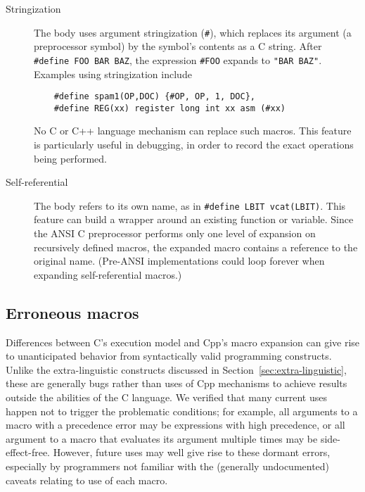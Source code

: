 \documentclass[10pt]{article}
\begin{document}
\begin{description}

\item[Stringization]
  The body uses argument stringization ({\tt \#}), which replaces its
  argument (a preprocessor symbol) by the symbol's contents as a C string.
  After {\tt \#define FOO BAR BAZ}, the expression {\tt \#FOO} expands to
  {\tt "BAR~BAZ"}.  Examples using stringization include
\begin{verbatim}
    #define spam1(OP,DOC) {#OP, OP, 1, DOC},
    #define REG(xx) register long int xx asm (#xx)
\end{verbatim}
  No C or C++ language mechanism can replace such macros.  This feature is
  particularly useful in debugging, in order to record the exact
  operations being performed.

\item[Self-referential]
  The body refers to its own name, as in {\tt \#define LBIT vcat(LBIT)}.
  This feature can build a wrapper around an existing function or variable.
  Since the ANSI C preprocessor performs only one level of expansion on
  recursively defined macros, the expanded macro contains a reference to
  the original name.  (Pre-ANSI implementations could loop forever when
  expanding self-referential macros.)

\end{description}



\subsection{Erroneous macros}
\label{sec:lint}

Differences between C's execution model and Cpp's macro expansion can give
rise to unanticipated behavior from syntactically valid programming
constructs.  Unlike the extra-linguistic constructs discussed in
Section~\ref{sec:extra-linguistic}, these are generally bugs rather than
uses of Cpp mechanisms to achieve results outside the abilities of the C
language.  We verified that many current uses happen not to trigger the
problematic conditions; for example, all arguments to a macro with a
precedence error may be expressions with high precedence, or all argument
to a macro that evaluates its argument multiple times may be
side-effect-free.  However, future uses may well give rise to these dormant
errors, especially by programmers not familiar with the (generally
undocumented) caveats relating to use of each macro.
\end{document}
